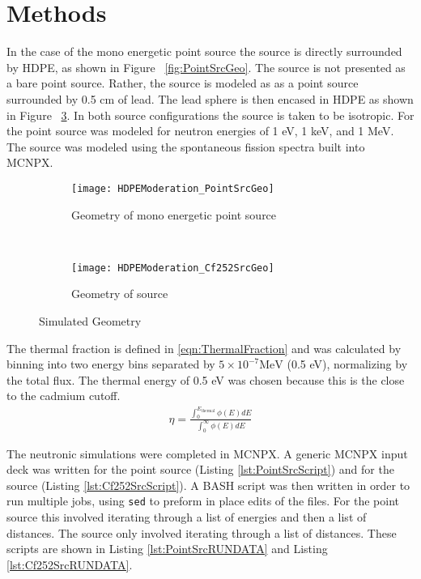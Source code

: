 \section{Methods}

In the case of the mono energetic point source the source is directly surrounded by HDPE, as shown in Figure ~\ref{fig:PointSrcGeo}. 
The  source is not presented as a bare point source.
Rather, the source is modeled as as a point  source surrounded by 0.5 cm of lead. The lead sphere is then encased in HDPE as shown in Figure ~\ref{fig:Cf252SrcGeo}.
In both source configurations the source is taken to be isotropic. 
For the point source was modeled for neutron energies of 1 eV, 1 keV, and 1 MeV.
The  source was modeled using the spontaneous fission spectra built into MCNPX.
\begin{figure}
  \centering
  \begin{subfigure}[b]{0.45\textwidth}
    \centering
    \texttt{[image: HDPEModeration\_PointSrcGeo]}
    \caption{Geometry of mono energetic point source}
    \label{fig:Cf252SrcGeo}
  \end{subfigure}%
  ~
  \begin{subfigure}[b]{0.45\textwidth}
    \centering
    \texttt{[image: HDPEModeration\_Cf252SrcGeo]}
    \caption{Geometry of  source}
    \label{fig:Cf252SrcGeo}
  \end{subfigure}
  \caption{Simulated Geometry}
\end{figure}

The thermal fraction is defined in \eqref{eqn:ThermalFraction} and was calculated by binning into two energy bins separated by $5\times10^{-7}\text{MeV}$ (0.5 eV), normalizing by the total flux.
The thermal energy of 0.5 eV was chosen because this is the close to the cadmium cutoff.
\begin{align}
    \label{eqn:ThermalFraction}
    \eta = \frac{\int_0 ^{E_\text{thermal}} \phi(E)dE}{\int_0^\infty \phi(E)dE}
\end{align}

The neutronic simulations were completed in MCNPX. 
A generic MCNPX input deck was written for the point source (Listing \ref{lst:PointSrcScript}) and for the  source (Listing \ref{lst:Cf252SrcScript}).
A BASH script was then written in order to run multiple jobs, using \verb+sed+ to preform in place edits of the files.
For the point source this involved iterating through a list of energies and then a list of distances.
The  source only involved iterating through a list of distances.
These scripts are shown in Listing \ref{lst:PointSrcRUNDATA} and Listing \ref{lst:Cf252SrcRUNDATA}.

